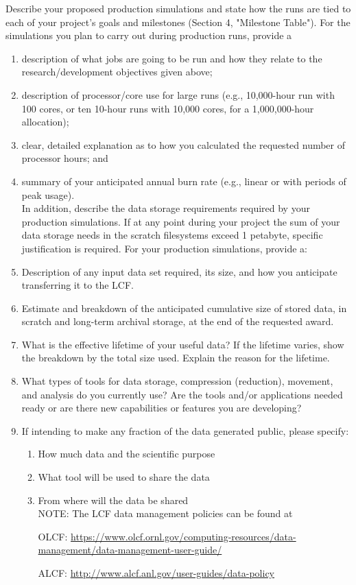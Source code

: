 \documentclass[11pt,letterpaper,english]{article}
\begin{document}
Describe your proposed production simulations and state how the runs are tied to each of your project's goals and milestones (Section 4, "Milestone Table"). For the simulations you plan to carry out during production runs, provide a
\begin{enumerate}
\item description of what jobs are going to be run and how they relate to the research/development objectives given above;
\item description of processor/core use for large runs (e.g., 10,000-hour run with 100 cores, or ten 10-hour runs with 10,000 cores, for a 1,000,000-hour allocation); 
\item clear, detailed explanation as to how you calculated the requested number of processor hours; and 
\item summary of your anticipated annual burn rate (e.g., linear or with periods of peak usage).\\
\vspace{.1in}
In addition, describe the data storage requirements required by your production simulations.  If at any point during your project the sum of your data storage needs in the scratch filesystems exceed 1 petabyte, specific justification is required. For your production simulations, provide a:

\item Description of any input data set required, its size, and how you anticipate transferring it to the LCF.
\item Estimate and breakdown of the anticipated cumulative size of stored data, in scratch and long-term archival storage, at the end of the requested award. 
\item What is the effective lifetime of your useful data?  If the lifetime varies, show the breakdown by the total size used.  Explain the reason for the lifetime. 
\item What types of tools for data storage, compression (reduction), movement, and analysis do you currently use? Are the tools and/or applications needed ready or are there new capabilities or features you are developing?
\item If intending to make any fraction of the data generated public, please specify:
\begin{enumerate}
\item How much data and the scientific purpose
\item What tool will be used to share the data
\item From where will the data be shared\\
\vspace{.1in}
NOTE: The LCF data management policies can be found at

OLCF:  {\href{https://www.olcf.ornl.gov/computing-resources/data-management/data-management-user-guide/}{https://www.olcf.ornl.gov/computing-resources/data-management/data-management-user-guide/}}

ALCF:  {\href{http://www.alcf.anl.gov/user-guides/data-policy}{http://www.alcf.anl.gov/user-guides/data-policy}}
\end{enumerate}
\end{enumerate}
\end{document}
